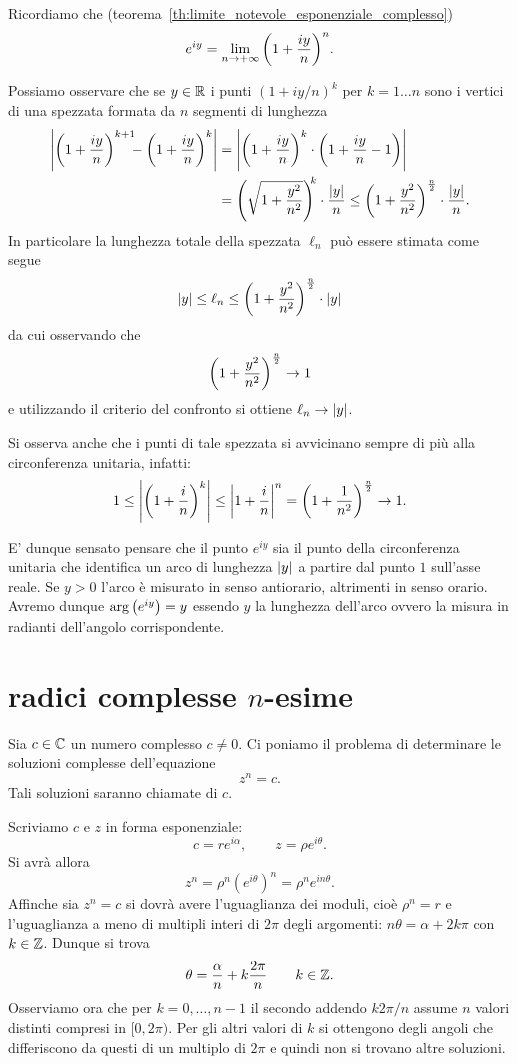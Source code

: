 \begin{remark}
Ricordiamo che (teorema~\ref{th:limite_notevole_esponenziale_complesso})
\[
  e^{iy} = \lim_{n\to +\infty} {\left( 1+\frac{iy}{n} \right)}^n.
\]

Possiamo osservare che se $y\in {\mathbb R}$
i punti $(1+iy/n)^k$ per $k=1\dots n$
sono i vertici di una spezzata
formata da $n$ segmenti
di lunghezza
\begin{align*}
 {\left|{\left( 1+\frac{iy}n \right)}^{k+1}\!\!\! - {\left( 1+ \frac{iy}n \right)}^k\right|}
 &= {\left|{\left( 1+\frac{iy}n \right)}^k\cdot {\left( 1+\frac{iy}n -1 \right)}\right|}\\
 &= {\left( \sqrt{1+\frac{y^2}{n^2}} \right)}^{\!\!k} \cdot \frac{{\left|y\right|}}{n}
 \le {\left( 1+\frac{y^2}{n^2} \right)}^{\frac n 2}\cdot \frac{{\left|y\right|}}{n}.
\end{align*}
In particolare la lunghezza totale della spezzata $\ell_n$ può essere stimata
come segue
\[
  {\left|y\right|}
  \le \ell_n
  \le {\left( 1+\frac{y^2}{n^2} \right)}^{\frac n 2} \cdot {\left|y\right|}
\]
da cui osservando che
\[
 {\left( 1+\frac{y^2}{n^2} \right)}^{\frac n 2} \to 1
\]
e utilizzando il criterio del confronto
si ottiene $\ell_n \to {\left|y\right|}$.

Si osserva anche che i punti di tale spezzata si avvicinano
sempre di più alla circonferenza unitaria, infatti:
\[
  1
  \le {\left|{\left( 1 + \frac i n \right)}^k\right|}
  \le {\left|1+\frac i n\right|}^n
  = {\left( 1 + \frac 1 {n^2} \right)}^{\frac n 2}
  \to 1.
\]

E' dunque sensato pensare che il punto $e^{iy}$ sia il punto
della circonferenza unitaria che identifica un arco di lunghezza ${\left|y\right|}$
a partire dal punto $1$ sull'asse reale.
Se $y>0$ l'arco è misurato in senso antiorario, altrimenti in senso orario.
Avremo dunque $\arg{\left( e^{iy} \right)} = y$ essendo $y$ la lunghezza dell'arco
ovvero la misura in radianti dell'angolo corrispondente.
\end{remark}

\section{radici complesse $n$-esime}

Sia $c\in {\mathbb C}$ un numero
complesso $c\neq 0$.
Ci poniamo il problema di determinare le soluzioni complesse
dell'equazione
\[
  z^n = c.
\]
Tali soluzioni saranno chiamate  di $c$.

Scriviamo $c$ e $z$ in forma esponenziale:
\[
  c = r e^{i\alpha}, \qquad
  z = \rho e^{i\theta}.
\]
Si avrà allora
\[
  z^n = \rho^n (e^{i\theta})^n = \rho^n e^{i n \theta}.
\]
Affinche sia $z^n = c$ si dovrà avere l'uguaglianza dei moduli, cioè $\rho^n = r$ e l'uguaglianza a meno di multipli interi di $2\pi$ degli argomenti:
$n \theta = \alpha + 2 k \pi$ con $k\in {\mathbb Z}$.
Dunque si trova
\[
  \theta = \frac{\alpha}{n} + k\frac{2\pi}{n}
\qquad k \in {\mathbb Z}.
\]
Osserviamo ora che per $k=0,\dots, n-1$ il secondo addendo
$k 2\pi /n$ assume $n$ valori distinti compresi in $[0,2\pi)$.
Per gli altri valori di $k$ si ottengono degli angoli che differiscono
da questi di un multiplo di $2\pi$ e quindi non si trovano
altre soluzioni.

